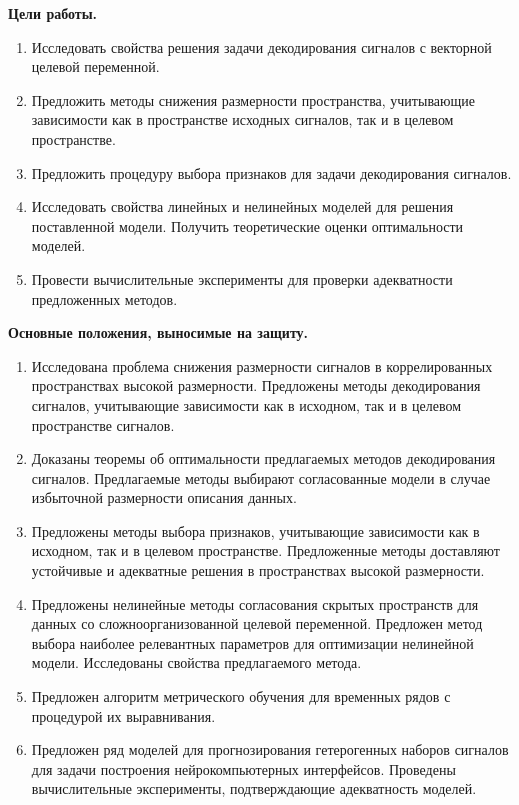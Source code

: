 \vspace{0.5cm}
\textbf{Цели работы.}
\begin{enumerate}
	\item Исследовать свойства решения задачи декодирования сигналов с векторной целевой переменной.
	\item Предложить методы снижения размерности пространства, учитывающие зависимости как в пространстве исходных сигналов, так и в целевом пространстве.
	\item Предложить процедуру выбора признаков для задачи декодирования сигналов.
	\item Исследовать свойства линейных и нелинейных моделей для решения поставленной модели. Получить теоретические оценки оптимальности моделей.
	\item Провести вычислительные эксперименты для проверки адекватности предложенных методов.
\end{enumerate}


\vspace{0.5cm}
\textbf{Основные положения, выносимые на защиту.}
\begin{enumerate}
	\item Исследована проблема снижения размерности сигналов в коррелированных пространствах высокой размерности. Предложены методы декодирования сигналов, учитывающие зависимости как в исходном, так и в целевом пространстве сигналов.
	\item Доказаны теоремы об оптимальности предлагаемых методов декодирования сигналов. Предлагаемые методы выбирают согласованные модели в случае избыточной размерности описания данных.
	\item Предложены методы выбора признаков, учитывающие зависимости как в исходном, так и в целевом пространстве. Предложенные методы доставляют устойчивые и адекватные решения в пространствах высокой размерности. 
	\item Предложены нелинейные методы согласования скрытых пространств для данных со сложноорганизованной целевой переменной. Предложен метод выбора наиболее релевантных параметров для оптимизации нелинейной модели. Исследованы свойства предлагаемого метода.
	\item Предложен алгоритм метрического обучения для временных рядов с процедурой их выравнивания.
	\item Предложен ряд моделей для прогнозирования гетерогенных наборов сигналов для задачи построения нейрокомпьютерных интерфейсов. Проведены вычислительные эксперименты, подтверждающие адекватность моделей.
\end{enumerate}

